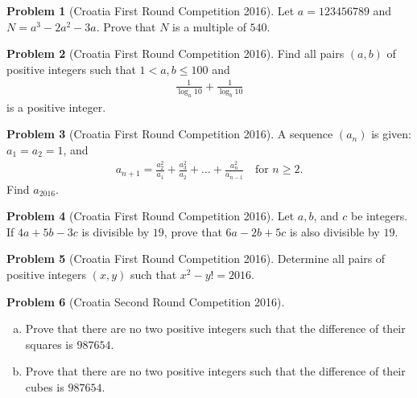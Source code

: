 \documentclass[]{article}
\theoremstyle{definition}
\newtheorem{problem}{Problem}
\begin{document}
\begin{problem}[Croatia First Round Competition 2016]
	Let $a = 123456789$ and $N = a^3 - 2a^2 - 3a$. Prove that $N$ is a multiple of $540$.
\end{problem}



\begin{problem}[Croatia First Round Competition 2016]
	Find all pairs $(a, b)$ of positive integers such that $1 < a, b \leq 100$ and
		\begin{align*}
			\frac{1}{\log_a 10} + \frac{1}{\log_b 10} 
		\end{align*}
	is a positive integer.
\end{problem}



\begin{problem}[Croatia First Round Competition 2016]
	A sequence $(a_n)$ is given: $a_1=a_2=1$, and
		\begin{align*}
			a_{n+1} = \frac{a_2^2}{a_1} + \frac{a_3^2}{a_2} + \dots + \frac{a_n^2}{a_{n-1}} \quad \text{for } n \geq 2.
		\end{align*}
	Find $a_{2016}$.
\end{problem}



\begin{problem}[Croatia First Round Competition 2016]
	Let $a, b$, and $c$ be integers. If $4a+5b-3c$ is divisible by $19$, prove that $6a-2b+5c$ is also divisible by $19$.
\end{problem}



\begin{problem}[Croatia First Round Competition 2016]
	Determine all pairs of positive integers $(x, y)$ such that $x^2 - y! = 2016$.
\end{problem}



\begin{problem}[Croatia Second Round Competition 2016]
	$ $
	\begin{enumerate}[(a)]
		\item Prove that there are no two positive integers such that the difference of their squares is $987654$.
		\item Prove that there are no two positive integers such that the difference of their cubes is $987654$.
	\end{enumerate}
\end{problem}
\end{document}
